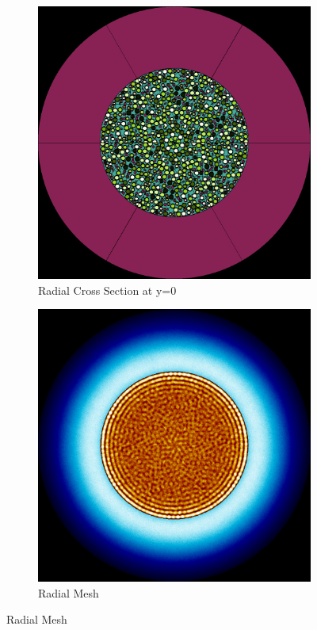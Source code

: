 \begin{figure}[H]
\centering

\begin{subfigure}{0.45\textwidth}
  \includegraphics[width=0.95\linewidth]{figures/120-180/120-180-r}
  \caption{Radial Cross Section at y=0}
  \label{fig:120-180-r}
\end{subfigure}%
%
\begin{subfigure}{0.45\textwidth}
  \includegraphics[width=0.95\linewidth]{figures/120-180/120-180-rm}
  \caption{Radial Mesh}
  \label{fig:120-180-rm}
\end{subfigure}


\end{figure}
